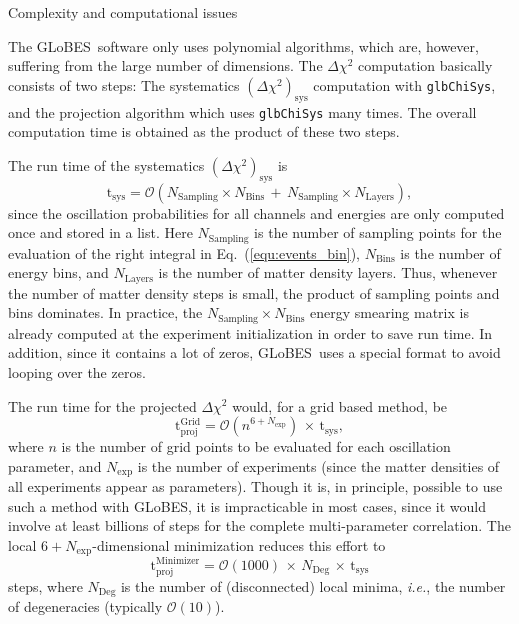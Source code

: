 \documentclass[12pt,a4paper]{article}
\makeatletter
\renewcommand{\section}{\@startsection{section}{1}{0em}{-\baselineskip}%
{\baselineskip}{\normalfont\large\bfseries}}
\newcommand{\ie}{{\it i.e.}}
\newcommand{\eq}{Eq.}
\newcommand{\GLOBES}{{\sf GLoBES}}
\newcommand{\equ}[1]{\eq~(\ref{equ:#1})}
\makeatother
\begin{document}
\section{Complexity and computational issues}

The \GLOBES\ software only uses polynomial algorithms, which are,
however, suffering from the large number of dimensions.
The $\Delta \chi^2$ computation basically consists of two steps:
The systematics $(\Delta \chi^2)_{\mathrm{sys}}$ computation with {\tt glbChiSys},
and the projection algorithm which uses {\tt glbChiSys} many times. 
The overall computation time is obtained as the product of these two steps.

The run time of the systematics $(\Delta \chi^2)_{\mathrm{sys}}$ 
is 
\begin{equation}
\mathrm{t_{sys}} = \mathcal{O} \left( N_{\mathrm{Sampling}} \times N_{\mathrm{Bins}}  \, + \, N_{\mathrm{Sampling}} \times N_{\mathrm{Layers}} \right) ,
\end{equation}
since the oscillation probabilities for all channels and energies
are only computed once and stored in a list. Here $N_{\mathrm{Sampling}}$ is the number of sampling points for the evaluation of the right integral in \equ{events_bin}, $N_{\mathrm{Bins}}$ is the number of energy bins,
and $N_{\mathrm{Layers}}$ is the number of matter density layers. Thus, whenever the
number of matter density steps is small, the product of sampling points
and bins dominates. In practice, the $N_{\mathrm{Sampling}} \times N_{\mathrm{Bins}}$ energy smearing matrix is already computed at 
the experiment initialization in order to save run time. In addition,
since it contains a lot of zeros, \GLOBES\ uses a special format to
avoid looping over the zeros.

The run time for the projected $\Delta \chi^2$ would, for a grid based method, be
\begin{equation}
 \mathrm{t_{proj}^{Grid}} = \mathcal{O}\left( n^{6+N_{\mathrm{exp}}}\right) \, \times \, \mathrm{t_{sys}},
\end{equation}
where $n$ is the number of grid points to be evaluated for each oscillation
parameter, and $N_{\mathrm{exp}}$ is the number of experiments
(since the matter densities of all experiments appear as parameters). 
Though it is, in principle, possible to use such a method with \GLOBES ,
it is impracticable in most cases, since it would involve at least 
billions of
steps for the complete multi-parameter correlation. The local $6+N_{\mathrm{exp}}$-dimensional minimization reduces this effort
to 
\begin{equation}
\mathrm{t_{proj}^{Minimizer}} = \mathcal{O}(1000) \, \times \,
N_{\mathrm{Deg}} \,  \times \, \mathrm{t_{sys}}
\end{equation}
steps, where $N_{\mathrm{Deg}}$ is the number of (disconnected) 
local minima, \ie, the number of
degeneracies (typically $\mathcal{O}(10)$).
\end{document}
